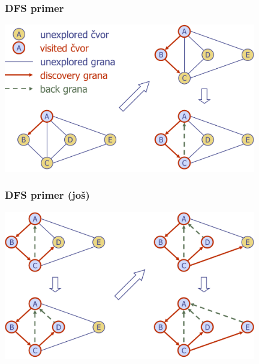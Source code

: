 \documentclass[compress,aspectratio=169]{beamer}
\begin{document}
\begin{frame}[fragile]
  \frametitle{DFS primer}
  \begin{center}
    \includegraphics[width=11cm]{asp-14-pic18.png}
  \end{center}
\end{frame}

\begin{frame}[fragile]
  \frametitle{DFS primer (još)}
  \begin{center}
    \includegraphics[width=11cm]{asp-14-pic19.png}
  \end{center}
\end{frame}
\end{document}
